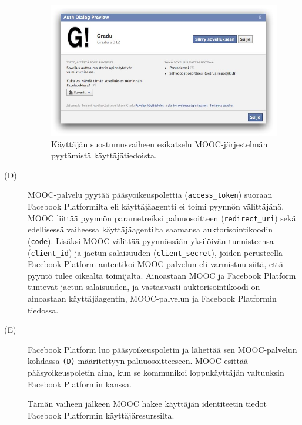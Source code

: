 \documentclass[finnish,gradu]{tktltiki}
\begin{document}
\begin{description}

  \begin{figure}
    \centering
    \includegraphics[width=1.0\textwidth]{images/facebook_auth_dialog.jpg}
    \caption[MOOC-järjestelmän pyytämät käyttäjätiedot.]{Käyttäjän suostumusvaiheen esikatselu MOOC-järjestelmän pyytämistä käyttäjätiedoista.}
    \label{fig:facebook_auth_dialog}
  \end{figure}


  \item[(D)]
    MOOC-palvelu pyytää pääsyoikeuspolettia (\verb!access_token!) suoraan Facebook Platformilta eli käyttäjäagentti ei toimi pyynnön välittäjänä. MOOC liittää pyynnön parametreiksi paluuosoitteen (\verb!redirect_uri!) sekä edellisessä vaiheessa käyttäjäagentilta saamansa auktorisointikoodin (\verb!code!). Lisäksi MOOC välittää pyynnössään yksilöivän tunnisteensa (\verb!client_id!) ja jaetun salaisuuden (\verb!client_secret!), joiden perusteella Facebook Platform autentikoi MOOC-palvelun eli varmistuu siitä, että pyyntö tulee oikealta toimijalta. Ainoastaan MOOC ja Facebook Platform tuntevat jaetun salaisuuden, ja vastaavasti auktorisointikoodi on ainoastaan käyttäjäagentin, MOOC-palvelun ja Facebook Platformin tiedossa.



  \item[(E)]
  Facebook Platform luo pääsyoikeuspoletin ja lähettää sen MOOC-pal\-velun kohdassa \verb!(D)! määritettyyn paluuosoitteeseen. MOOC esittää pääsyoikeuspoletin aina, kun se kommunikoi loppukäyttäjän valtuuksin Facebook Platformin kanssa.

  Tämän vaiheen jälkeen MOOC hakee käyttäjän identiteetin tiedot Facebook Platformin käyttäjäresurssilta.

  \end{description}
\end{document}
